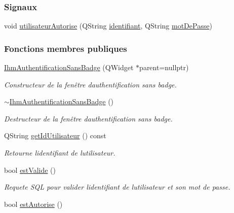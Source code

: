 \subsubsection*{Signaux}
\begin{DoxyCompactItemize}
\item 
void \hyperlink{class_ihm_authentification_sans_badge_a610528b307f2a3f3253aed3b5f628837}{utilisateur\+Autorise} (Q\+String \hyperlink{class_ihm_authentification_sans_badge_aff90fe3fcf957daa57ca0318a4b1a2d0}{identifiant}, Q\+String \hyperlink{class_ihm_authentification_sans_badge_a3a5c5887be56c7f1b5dcd1bf824d09c4}{mot\+De\+Passe})
\end{DoxyCompactItemize}
\subsubsection*{Fonctions membres publiques}
\begin{DoxyCompactItemize}
\item 
\hyperlink{class_ihm_authentification_sans_badge_aace6d9eebcab9fee429fe9dbb6840f15}{Ihm\+Authentification\+Sans\+Badge} (Q\+Widget $\ast$parent=nullptr)
\begin{DoxyCompactList}\small\item\em Constructeur de la fenêtre d\textquotesingle{}authentification sans badge. \end{DoxyCompactList}\item 
\hyperlink{class_ihm_authentification_sans_badge_a39197686724a0ad151c0c998301c198e}{$\sim$\+Ihm\+Authentification\+Sans\+Badge} ()
\begin{DoxyCompactList}\small\item\em Destructeur de la fenêtre d\textquotesingle{}authentification sans badge. \end{DoxyCompactList}\item 
Q\+String \hyperlink{class_ihm_authentification_sans_badge_acd5fea74d025db830e6e880e55d5c2f0}{get\+Id\+Utilisateur} () const
\begin{DoxyCompactList}\small\item\em Retourne l\textquotesingle{}identifiant de l\textquotesingle{}utilisateur. \end{DoxyCompactList}\item 
bool \hyperlink{class_ihm_authentification_sans_badge_a676cfdbf93ef79fb7c4c47fdd8d0fb43}{est\+Valide} ()
\begin{DoxyCompactList}\small\item\em Requete S\+QL pour valider l\textquotesingle{}identifiant de l\textquotesingle{}utilisateur et son mot de passe. \end{DoxyCompactList}\item 
bool \hyperlink{class_ihm_authentification_sans_badge_a17b178accdfe141a7e27fa1888bebcbc}{est\+Autorise} ()
\end{DoxyCompactItemize}
